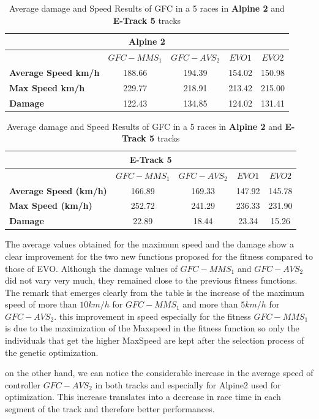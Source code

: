 \documentclass[conference]{IEEEtran}
\begin{document}
\begin{table}[!ht]
  \centering
  {\scriptsize
    \caption{Average damage and Speed Results of GFC in a 5 races in \textbf{Alpine 2} and  \textbf{E-Track 5} tracks}
    \label{tab:damagespeed}
    \begin{tabular}{|p{1.65cm}|c|c|c|c|}
      \hline 
      \multicolumn{5}{|c|}{\textbf{Alpine 2}}  \\	
      \hline  
   & \textbf{$GFC-MMS_1$}&\textbf{$GFC-AVS_2$} & \textbf{$EVO1$} &\textbf{$EVO2$}\\					
      \hline \textbf{Average Speed km/h}& 188.66&194.39&154.02&150.98\\
      \hline \textbf{Max Speed km/h}& 229.77&218.91&213.42&215.00\\	
      \hline \textbf{Damage}& 122.43& 134.85&124.02 &131.41\\	
      \hline 
    \end{tabular}
    \begin{tabular}{|p{1.65cm}|c|c|c|c|}
      \multicolumn{5}{|c|}{\textbf{E-Track 5}}  \\
      \hline 
   & \textbf{$GFC-MMS_1$}&\textbf{$GFC-AVS_2$} & \textbf{$EVO1$} &\textbf{$EVO2$} \\				
      \hline \textbf{Average Speed (km/h)}& 166.89&169.33&147.92&145.78\\
      \hline \textbf{Max Speed  (km/h)}&252.72&241.29&236.33&231.90\\	
      \hline \textbf{Damage}& 22.89& 18.44&23.34 &15.26\\	
      \hline 
    \end{tabular}
	}
\end{table} 

The average values obtained for the maximum speed and the damage show a clear improvement for the two new functions proposed for the fitness compared to those of EVO.
Although the damage values of $GFC-MMS_1$ and $GFC-AVS_2$ did not vary very much, they remained close to the previous fitness functions.
The remark that emerges clearly from the table is the increase of the maximum speed of more than $10 km/h$ for $GFC-MMS_1$ and more than $5 km/h$ for $GFC-AVS_2$.
this improvement in speed especially for the fitness $GFC-MMS_1$ is due to the maximization of the Maxspeed in the fitness function so only the individuals that get the higher MaxSpeed are kept after the selection process of the genetic optimization.

on the other hand, we can notice the considerable increase in the average speed of controller $GFC-AVS_2$ in both tracks and especially for Alpine2 used for optimization.
This increase translates into a decrease in race time in each segment of the track and therefore better performances.
\end{document}

